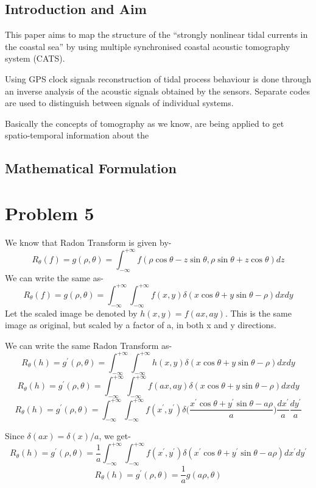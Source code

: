 \documentclass[a4paper,11pt]{article}
\numberwithin{definition}{section}
\numberwithin{mytheorem}{subsection}
\begin{document}
\subsection{Introduction and Aim}

This paper aims to map the structure of the ``strongly
nonlinear tidal currents in the coastal sea'' by using multiple synchronised coastal acoustic tomography system (CATS).

Using GPS clock signals reconstruction of tidal process behaviour is done through an inverse analysis of the acoustic signals obtained by the sensors. Separate codes are used to distinguish between signals of individual systems.

Basically the concepts of tomography as we know, are being applied to get spatio-temporal information about the 



\subsection{Mathematical Formulation}




\section{Problem 5}

We know that Radon Transform is given by-
$$R_\theta(f) =g(\rho, \theta)= \int_{-\infty}^{+\infty}f(\rho\cos\theta - z\sin\theta,\rho\sin \theta + z\cos\theta)dz $$
We can write the same as-
$$R_\theta(f) =g(\rho, \theta)= \int_{-\infty}^{+\infty}\int_{-\infty}^{+\infty}f(x,y)\delta(x\cos\theta+y\sin\theta -\rho)dxdy $$
Let the scaled image be denoted by $h(x,y) = f(ax, ay)$. This is the same image as original, but scaled by a factor of a, in both x and y directions.

We can write the same Radon Transform as-
$$ R_\theta(h) =g^{\prime}(\rho, \theta)= \int_{-\infty}^{+\infty}\int_{-\infty}^{+\infty}h(x,y)\delta(x\cos\theta+y\sin\theta -\rho)dxdy $$
$$ R_\theta(h) =g^{\prime}(\rho, \theta)= \int_{-\infty}^{+\infty}\int_{-\infty}^{+\infty}f(ax,ay)\delta(x\cos\theta+y\sin\theta -\rho)dxdy $$
$$ R_\theta(h) =g^{\prime}(\rho, \theta)= \int_{-\infty}^{+\infty}\int_{-\infty}^{+\infty}f(x^{\prime},y^{\prime})\delta\bigg(\frac{x^{\prime}\cos\theta+y^{\prime}\sin\theta -a\rho}{a}\bigg)\frac{dx^{\prime}}{a}\frac{dy^{\prime}}{a} $$

Since $\delta(ax) = \delta(x)/a$, we get-
$$ R_\theta(h) =g^{\prime}(\rho, \theta)= \frac{1}{a}\int_{-\infty}^{+\infty}\int_{-\infty}^{+\infty}f(x^{\prime},y^{\prime})\delta(x^{\prime}\cos\theta+y^{\prime}\sin\theta -a\rho)dx^{\prime}dy^{\prime} $$
$$ R_\theta(h) =g^{\prime}(\rho, \theta)= \frac{1}{a}g(a\rho, \theta) $$
\end{document}
